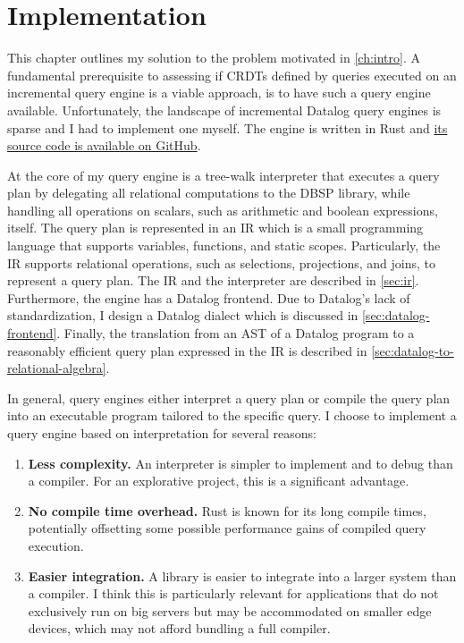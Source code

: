 
\chapter{Implementation}\label{ch:implementation}

This chapter outlines my solution to the problem motivated in \ref{ch:intro}.
A fundamental prerequisite to assessing if \acp{CRDT} defined by queries
executed on an incremental query engine is a viable approach,
is to have such a query engine available.
Unfortunately, the landscape of incremental Datalog query engines is sparse
and I had to implement one myself.
The engine is written in Rust and \href{https://github.com/lstwn/masterthesis}{%
its source code is available on GitHub}\footnotemark{}.


At the core of my query engine is a tree-walk interpreter that executes a
query plan by delegating all relational computations to the DBSP library,
while handling all operations on scalars, such as arithmetic and boolean
expressions, itself.
The query plan is represented in an \acf{IR} which is a small programming
language that supports variables, functions, and static scopes.
Particularly, the \ac{IR} supports relational operations,
such as selections, projections, and joins, to represent a query plan.
The \ac{IR} and the interpreter are described in \ref{sec:ir}.
Furthermore, the engine has a Datalog frontend.
Due to Datalog's lack of standardization, I design a Datalog dialect which is
discussed in \ref{sec:datalog-frontend}.
Finally, the translation from an \ac{AST} of a Datalog program to a reasonably
efficient query plan expressed in the \ac{IR} is described
in \ref{sec:datalog-to-relational-algebra}.

In general, query engines either interpret a query plan or compile the query
plan into an executable program tailored to the specific query.
I choose to implement a query engine based on interpretation for several
reasons:

\begin{enumerate}
    \item \textbf{Less complexity.}
          An interpreter is simpler to implement and to debug than a compiler.
          For an explorative project, this is a significant advantage.
    \item \textbf{No compile time overhead.}
          Rust is known for its long compile times, potentially offsetting some
          possible performance gains of compiled query execution.
    \item \textbf{Easier integration.}
          A library is easier to integrate into a larger system than a compiler.
          I think this is particularly relevant for applications that do not
          exclusively run on big servers but may be accommodated on smaller
          edge devices, which may not afford bundling a full compiler.
\end{enumerate}

